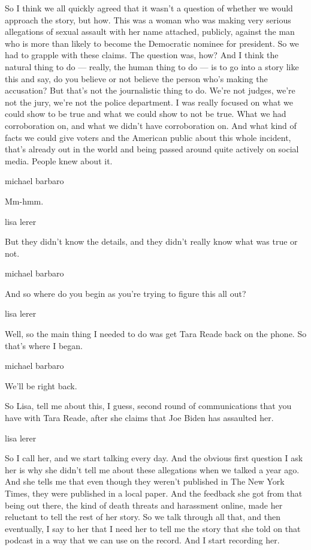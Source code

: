 So I think we all quickly agreed that it wasn't a question of whether we
would approach the story, but how. This was a woman who was making very
serious allegations of sexual assault with her name attached, publicly,
against the man who is more than likely to become the Democratic nominee
for president. So we had to grapple with these claims. The question was,
how? And I think the natural thing to do --- really, the human thing to
do --- is to go into a story like this and say, do you believe or not
believe the person who's making the accusation? But that's not the
journalistic thing to do. We're not judges, we're not the jury, we're
not the police department. I was really focused on what we could show to
be true and what we could show to not be true. What we had corroboration
on, and what we didn't have corroboration on. And what kind of facts we
could give voters and the American public about this whole incident,
that's already out in the world and being passed around quite actively
on social media. People knew about it.

michael barbaro

Mm-hmm.

lisa lerer

But they didn't know the details, and they didn't really know what was
true or not.

michael barbaro

And so where do you begin as you're trying to figure this all out?

lisa lerer

Well, so the main thing I needed to do was get Tara Reade back on the
phone. So that's where I began.

michael barbaro

We'll be right back.

So Lisa, tell me about this, I guess, second round of communications
that you have with Tara Reade, after she claims that Joe Biden has
assaulted her.

lisa lerer

So I call her, and we start talking every day. And the obvious first
question I ask her is why she didn't tell me about these allegations
when we talked a year ago. And she tells me that even though they
weren't published in The New York Times, they were published in a local
paper. And the feedback she got from that being out there, the kind of
death threats and harassment online, made her reluctant to tell the rest
of her story. So we talk through all that, and then eventually, I say to
her that I need her to tell me the story that she told on that podcast
in a way that we can use on the record. And I start recording her.

